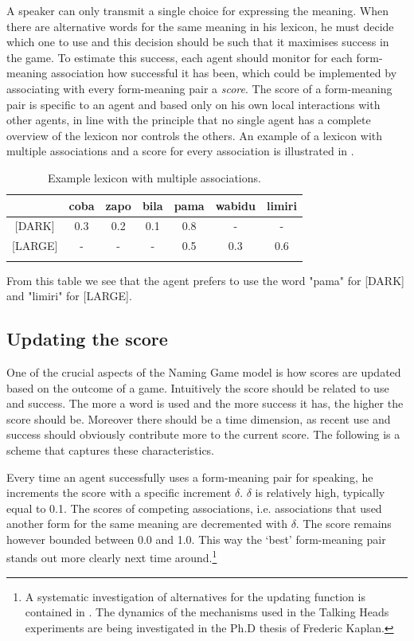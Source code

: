 A speaker can only transmit a single choice for 
expressing the meaning.
When there are alternative words for the same meaning in 
his lexicon, he must decide which one to use and this decision
should be such that it maximises success in the game. 
To estimate this success, 
each agent should monitor for each form-meaning association
how successful it has been, which could be implemented 
by associating with every form-meaning pair 
a {\itshape score}. The score of a form-meaning pair
is specific to an agent and based only on his own 
local interactions with other agents, in line with the 
principle that no single agent has a complete overview of 
the lexicon nor controls the others. An example of 
a lexicon with multiple associations and a score for every 
association is illustrated in . 
\begin{table}
\begin{center}
\begin{tabular}{c c c c  c  c  c } \lsptoprule 
& coba & zapo & bila & pama & wabidu & limiri \\ 
\midrule {}		
{}[DARK] & 0.3 & 0.2 & 0.1 & 0.8 & - & - \\ 
{}[LARGE] & - & - & - & 0.5 & 0.3 & 0.6 \\ 
\lspbottomrule
\end{tabular}
\caption{\label{tab:mem2} Example lexicon with multiple associations.}
\end{center}
\end{table}
From this table we see that the agent prefers to use the 
word "pama" for [DARK] and "limiri" for [LARGE]. 

\subsection{Updating the score}

One of the crucial aspects of the Naming Game model
is how scores are updated based on the outcome of 
a game. Intuitively 
the score should be related to use and success. 
The more a word is used and the more success it 
has, the higher the score should be. Moreover
there should be a time dimension, 
as recent use and success should obviously contribute
more to the current score. 
The following is a scheme that captures these
characteristics. 

Every time an agent successfully uses a form-meaning pair 
for speaking, he increments
the score with a specific increment $\delta$. 
$\delta$ is relatively high, typically equal to 0.1. 
The scores of competing associations, i.e. 
associations that used another form for the same meaning
are decremented with $\delta$. The score remains however bounded 
between 0.0 and 1.0. This way the `best' 
form-meaning pair stands out more clearly next time 
around.\footnote{A systematic investigation of alternatives for 
the updating function is contained in \cite{Oliphant:1997}. 
The dynamics of the mechanisms used in the 
Talking Heads experiments are being investigated in the
Ph.D thesis of Frederic Kaplan.}

